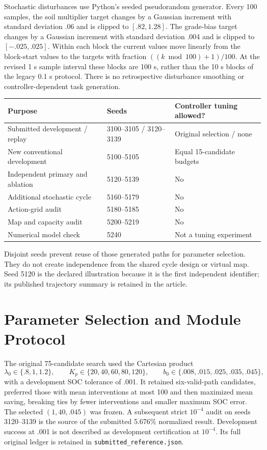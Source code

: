 \documentclass[11pt,a4paper]{article}
\begin{document}
Stochastic disturbances use Python's seeded pseudorandom generator. Every 100 samples, the soil multiplier target changes by a Gaussian increment with standard deviation .06 and is clipped to $[.82,1.28]$. The grade-bias target changes by a Gaussian increment with standard deviation .004 and is clipped to $[-.025,.025]$. Within each block the current values move linearly from the block-start values to the targets with fraction $((k\bmod100)+1)/100$. At the revised 1 s sample interval these blocks are 100 s, rather than the 10 s blocks of the legacy 0.1 s protocol. There is no retrospective disturbance smoothing or controller-dependent task generation.

\begin{center}\small\begin{tabular}{lll}\toprule
Purpose & Seeds & Controller tuning allowed?\\\midrule
Submitted development / replay & 3100--3105 / 3120--3139 & Original selection / none\\
New conventional development & 5100--5105 & Equal 15-candidate budgets\\
Independent primary and ablation & 5120--5139 & No\\
Additional stochastic cycle & 5160--5179 & No\\
Action-grid audit & 5180--5185 & No\\
Map and capacity audit & 5200--5219 & No\\
Numerical model check & 5240 & Not a tuning experiment\\\bottomrule
\end{tabular}\end{center}
Disjoint seeds prevent reuse of those generated paths for parameter selection. They do not create independence from the shared cycle design or virtual map. Seed 5120 is the declared illustration because it is the first independent identifier; its published trajectory summary is retained in the article.

\section{Parameter Selection and Module Protocol}
The original 75-candidate search used the Cartesian product
\[
\lambda_0\in\{.8,1,1.2\},\qquad K_p\in\{20,40,60,80,120\},
\qquad b_0\in\{.008,.015,.025,.035,.045\},
\]
with a development SOC tolerance of .001. It retained six-valid-path candidates, preferred those with mean interventions at most 100 and then maximized mean saving, breaking ties by fewer interventions and smaller maximum SOC error. The selected $(1,40,.045)$ was frozen. A subsequent strict $10^{-4}$ audit on seeds 3120--3139 is the source of the submitted 5.676\% normalized result. Development success at .001 is not described as development certification at $10^{-4}$. Its full original ledger is retained in \texttt{submitted\_reference.json}.
\end{document}
